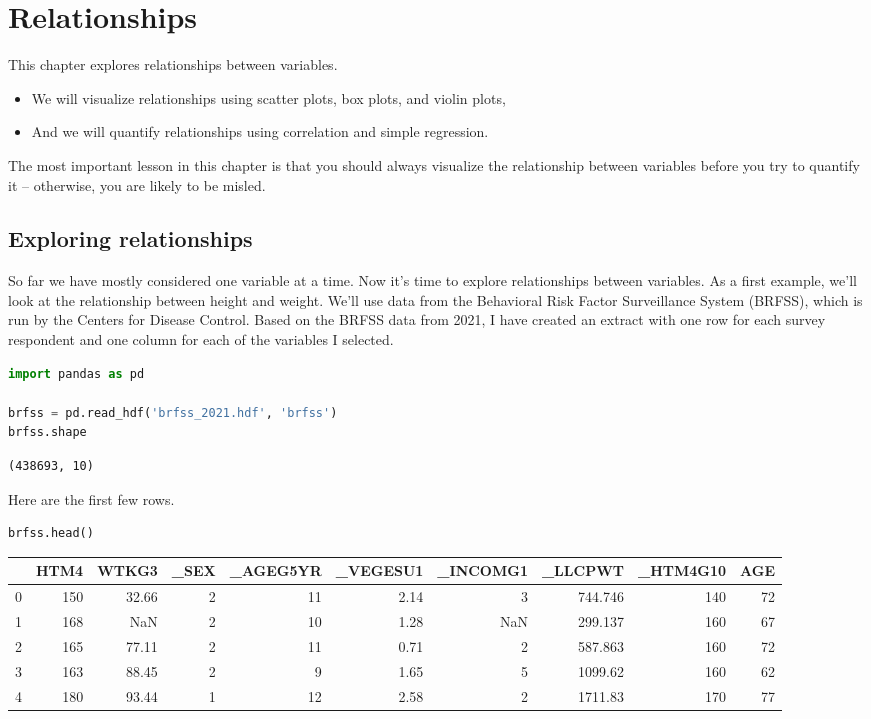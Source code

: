 \chapter{Relationships}\label{relationships}

This chapter explores relationships between variables.

\begin{itemize}
\item
  We will visualize relationships using scatter plots, box plots, and
  violin plots,
\item
  And we will quantify relationships using correlation and simple
  regression.
\end{itemize}

The most important lesson in this chapter is that you should always
visualize the relationship between variables before you try to quantify
it -- otherwise, you are likely to be misled.

\section{Exploring relationships}\label{exploring-relationships}

So far we have mostly considered one variable at a time. Now it's time
to explore relationships between variables. As a first example, we'll
look at the relationship between height and weight. We'll use data from
the Behavioral Risk Factor Surveillance System (BRFSS), which is run by
the Centers for Disease Control. Based on the BRFSS data from 2021, I
have created an extract with one row for each survey respondent and one
column for each of the variables I selected.

\begin{lstlisting}[language=Python,style=source]
import pandas as pd

brfss = pd.read_hdf('brfss_2021.hdf', 'brfss')
brfss.shape
\end{lstlisting}

\begin{lstlisting}[style=output]
(438693, 10)
\end{lstlisting}

Here are the first few rows.

\begin{lstlisting}[language=Python,style=source]
brfss.head()
\end{lstlisting}



\begin{tabular}{lrrrrrrrrr}
\midrule
 & HTM4 & WTKG3 & \_SEX & \_AGEG5YR & \_VEGESU1 & \_INCOMG1 & \_LLCPWT & \_HTM4G10 & AGE \\
\midrule
0 & 150 & 32.66 & 2 & 11 & 2.14 & 3 & 744.746 & 140 & 72 \\
1 & 168 & NaN & 2 & 10 & 1.28 & NaN & 299.137 & 160 & 67 \\
2 & 165 & 77.11 & 2 & 11 & 0.71 & 2 & 587.863 & 160 & 72 \\
3 & 163 & 88.45 & 2 & 9 & 1.65 & 5 & 1099.62 & 160 & 62 \\
4 & 180 & 93.44 & 1 & 12 & 2.58 & 2 & 1711.83 & 170 & 77 \\
\midrule
\end{tabular}

